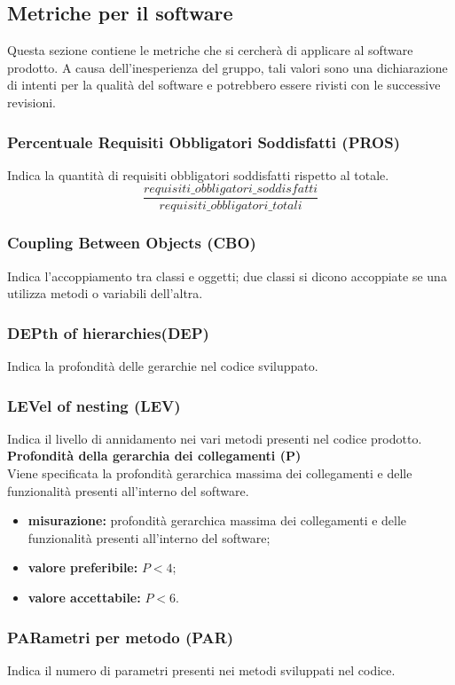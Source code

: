 \subsection{Metriche per il software}
Questa sezione contiene le metriche che si cercherà di applicare al software prodotto. A causa dell’inesperienza del gruppo, tali valori sono una dichiarazione di intenti per la qualità del software e potrebbero essere rivisti con le successive revisioni.

\subsubsection{Percentuale Requisiti Obbligatori Soddisfatti (PROS)}
Indica la quantità di requisiti obbligatori soddisfatti rispetto al totale.
\[\frac{requisiti\_obbligatori\_soddisfatti}{requisiti\_obbligatori\_totali}\]

\subsubsection{Coupling Between Objects (CBO)}
Indica l'accoppiamento tra classi e oggetti; due classi si dicono accoppiate se una utilizza metodi o variabili dell'altra.

\subsubsection{DEPth of hierarchies(DEP)}
Indica la profondità delle gerarchie nel codice sviluppato.

\subsubsection{LEVel of nesting (LEV)}
Indica il livello di annidamento nei vari metodi presenti nel codice prodotto.
\textbf{Profondità della gerarchia dei collegamenti (P)}\\
Viene specificata la profondità gerarchica massima dei collegamenti e delle funzionalità presenti all'interno del software.
\begin{itemize}
	\item \textbf{misurazione:} profondità gerarchica massima dei collegamenti e delle funzionalità presenti all'interno del software;
	\item \textbf{valore preferibile:} $P < 4$;
	\item \textbf{valore accettabile:} $P < 6$.
\end{itemize}

\subsubsection{PARametri per metodo (PAR)}
Indica il numero di parametri presenti nei metodi sviluppati nel codice.

